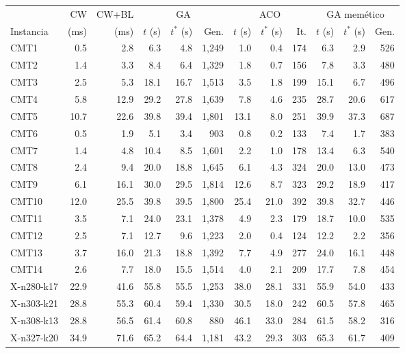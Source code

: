 \begin{tabular}{lrrrrrrrrrrr}
\toprule
 & CW & CW+BL & \multicolumn{3}{c}{GA} & \multicolumn{3}{c}{ACO} & \multicolumn{3}{c}{GA memético} \\
\cmidrule(lr){4-6}\cmidrule(lr){7-9}\cmidrule(lr){10-12}
Instancia & (ms) & (ms) & $t$ (s) & $t^*$ (s) & Gen. & $t$ (s) & $t^*$ (s) & It. & $t$ (s) & $t^*$ (s) & Gen. \\
\midrule
CMT1 & 0.5 & 2.8 & 6.3 & 4.8 & 1,249 & 1.0 & 0.4 & 174 & 6.3 & 2.9 & 526 \\
CMT2 & 1.4 & 3.3 & 8.4 & 6.4 & 1,329 & 1.8 & 0.7 & 156 & 7.8 & 3.3 & 480 \\
CMT3 & 2.5 & 5.3 & 18.1 & 16.7 & 1,513 & 3.5 & 1.8 & 199 & 15.1 & 6.7 & 496 \\
CMT4 & 5.8 & 12.9 & 29.2 & 27.8 & 1,639 & 7.8 & 4.6 & 235 & 28.7 & 20.6 & 617 \\
CMT5 & 10.7 & 22.6 & 39.8 & 39.4 & 1,801 & 13.1 & 8.0 & 251 & 39.9 & 37.3 & 687 \\
CMT6 & 0.5 & 1.9 & 5.1 & 3.4 & 903 & 0.8 & 0.2 & 133 & 7.4 & 1.7 & 383 \\
CMT7 & 1.4 & 4.8 & 10.4 & 8.5 & 1,601 & 2.2 & 1.0 & 178 & 13.4 & 6.3 & 540 \\
CMT8 & 2.4 & 9.4 & 20.0 & 18.8 & 1,645 & 6.1 & 4.3 & 324 & 20.0 & 13.0 & 473 \\
CMT9 & 6.1 & 16.1 & 30.0 & 29.5 & 1,814 & 12.6 & 8.7 & 323 & 29.2 & 18.9 & 417 \\
CMT10 & 12.0 & 25.5 & 39.8 & 39.5 & 1,800 & 25.4 & 21.0 & 392 & 39.8 & 32.7 & 446 \\
CMT11 & 3.5 & 7.1 & 24.0 & 23.1 & 1,378 & 4.9 & 2.3 & 179 & 18.7 & 10.0 & 535 \\
CMT12 & 2.5 & 7.1 & 12.7 & 9.6 & 1,223 & 2.0 & 0.4 & 124 & 12.2 & 2.2 & 356 \\
CMT13 & 3.7 & 16.0 & 21.3 & 18.8 & 1,392 & 7.7 & 4.9 & 277 & 24.0 & 16.1 & 448 \\
CMT14 & 2.6 & 7.7 & 18.0 & 15.5 & 1,514 & 4.0 & 2.1 & 209 & 17.7 & 7.8 & 454 \\
\midrule
X-n280-k17 & 22.9 & 41.6 & 55.8 & 55.5 & 1,253 & 38.0 & 28.1 & 331 & 55.9 & 54.0 & 433 \\
X-n303-k21 & 28.8 & 55.3 & 60.4 & 59.4 & 1,330 & 30.5 & 18.0 & 242 & 60.5 & 57.8 & 465 \\
X-n308-k13 & 28.8 & 56.5 & 61.4 & 60.8 & 880 & 46.1 & 33.0 & 284 & 61.5 & 58.2 & 316 \\
X-n327-k20 & 34.9 & 71.6 & 65.2 & 64.4 & 1,181 & 43.2 & 29.3 & 303 & 65.3 & 61.7 & 409 \\

\end{tabular}
